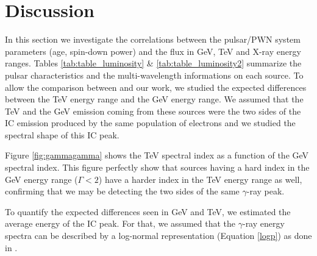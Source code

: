 \section{Discussion}
\label{discussion}




In this section we investigate the correlations between the pulsar/PWN system parameters (age, spin-down power) and the flux in GeV, TeV and X-ray energy ranges. Tables \ref{tab:table_luminosity} \& \ref{tab:table_luminosity2} summarize the pulsar characteristics and the multi-wavelength informations on each source. To allow the comparison between \cite{2009ApJ...694...12M} and our work, we studied the expected differences between the TeV energy range and the GeV energy range. We assumed that the TeV and the GeV emission coming from these sources were the two sides of the IC emission produced by the same population of electrons and we studied the spectral shape of this IC peak.

Figure \ref{fig:gammagamma} shows the TeV spectral index as a function of the GeV spectral index. This figure perfectly show that sources having a hard index in the GeV energy range ($\Gamma < 2$) have a harder index in the TeV energy range as well, confirming that we may be detecting the two sides of the same $\gamma$-ray peak.

To quantify the expected differences seen in GeV and TeV, we estimated the average energy of the IC peak. For that, we assumed that the $\gamma$-ray energy spectra can be described by a log-normal representation (Equation \ref{logp}) as done in  \cite{2008ApJ...674.1037A}.

